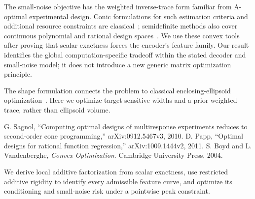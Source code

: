 
The small-noise objective has the weighted inverse-trace form familiar from A-optimal experimental design. Conic formulations for such estimation criteria and additional resource constraints are classical~\cite[Sec. 4.1 and Theorem 4.1]{sagnol2010}; semidefinite methods also cover continuous polynomial and rational design spaces~\cite[Example 6 and Theorem 9]{papp2011}. We use these convex tools after proving that scalar exactness forces the encoder's feature family. Our result identifies the global computation-specific tradeoff within the stated decoder and small-noise model; it does not introduce a new generic matrix optimization principle.

The shape formulation connects the problem to classical enclosing-ellipsoid optimization~\cite[Chap. 8]{boyd2004}. Here we optimize target-sensitive widths and a prior-weighted trace, rather than ellipsoid volume.

 G. Sagnol, ``Computing optimal designs of multiresponse experiments reduces to second-order cone programming,'' arXiv:0912.5467v3, 2010.
 D. Papp, ``Optimal designs for rational function regression,'' arXiv:1009.1444v2, 2011.
 S. Boyd and L. Vandenberghe, \emph{Convex Optimization}. Cambridge University Press, 2004.

We derive local additive factorization from scalar exactness, use restricted additive rigidity to identify every admissible feature curve, and optimize its conditioning and small-noise risk under a pointwise peak constraint.

